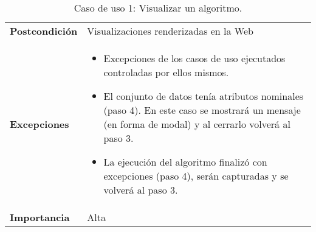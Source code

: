 \begin{table}[p]
\begin{tabularx}{\linewidth}{ p{} p{} }
		\textbf{Postcondición}        & Visualizaciones renderizadas en la Web \\
		\textbf{Excepciones}          & \begin{itemize}
			\item Excepciones de los casos de uso ejecutados controladas por ellos mismos.
			\item El conjunto de datos tenía atributos nominales (paso 4). En este caso se mostrará un mensaje (en forma de modal) y al cerrarlo volverá al paso 3.
			\item La ejecución del algoritmo finalizó con excepciones (paso 4), serán capturadas y se volverá al paso 3.
		\end{itemize}	 \\
		\textbf{Importancia}          & Alta\\
		\bottomrule
	\end{tabularx}
	\caption{Caso de uso 1: Visualizar un algoritmo.}
\end{table}



